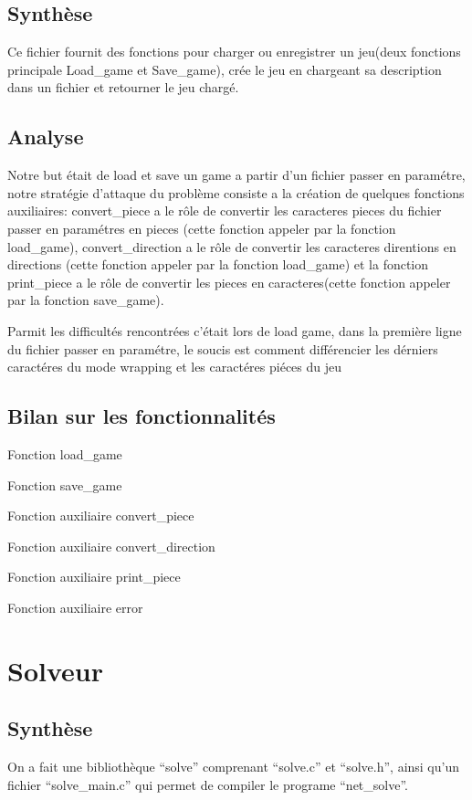 \documentclass[12pt]{article}
\begin{document}
\subsection{Synthèse}
Ce fichier fournit des fonctions pour charger ou enregistrer un jeu(deux fonctions principale Load\_game et Save\_game), crée le jeu en chargeant sa description dans un fichier et retourner le jeu chargé.
\subsection{Analyse}
Notre but était de load et save un game a partir d'un fichier passer en paramétre, notre stratégie d'attaque du problème consiste a la création de quelques fonctions auxiliaires: convert\_piece a le rôle de convertir les caracteres pieces du fichier passer en paramétres en pieces (cette fonction appeler par la fonction load\_game), convert\_direction a le rôle de convertir les caracteres direntions en directions (cette fonction appeler par la fonction load\_game) et la fonction print\_piece a le rôle de convertir les pieces en caracteres(cette fonction appeler par la fonction save\_game).

Parmit les difficultés rencontrées c'était lors de load game, dans la première ligne du fichier passer en paramétre, le soucis est comment différencier les dérniers caractéres du mode wrapping et les caractéres piéces du jeu
\subsection{Bilan sur les fonctionnalités}
Fonction load\_game

Fonction save\_game

Fonction auxiliaire convert\_piece

Fonction auxiliaire convert\_direction

Fonction auxiliaire print\_piece

Fonction auxiliaire error
 


\section{Solveur}
\subsection{Synthèse}
On a fait une bibliothèque ``solve'' comprenant ``solve.c'' et ``solve.h'', ainsi qu'un fichier ``solve\_main.c'' qui permet de compiler le programe ``net\_solve''.
\end{document}
